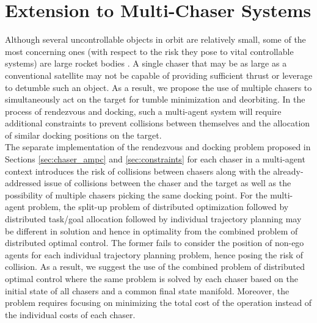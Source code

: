 \section{Extension to Multi-Chaser Systems}
\label{sec:multi-agent}
Although several uncontrollable objects in orbit are relatively small, some of the most concerning ones (with respect to the risk they pose to vital controllable systems) are large rocket bodies \cite{mcknight2021identifying}.
A single chaser that may be as large as a conventional satellite may not be capable of providing sufficient thrust or leverage to detumble such an object.
As a result, we propose the use of multiple chasers to simultaneously act on the target for tumble minimization and deorbiting.
In the process of rendezvous and docking, such a multi-agent system will require additional constraints to prevent collisions between themselves and the allocation of similar docking positions on the target.\\
The separate implementation of the rendezvous and docking problem proposed in Sections \ref{sec:chaser_ampc} and \ref{sec:constraints} for each chaser in a multi-agent context introduces the risk of collisions between chasers along with the already-addressed issue of collisions between the chaser and the target as well as the possibility of multiple chasers picking the same docking point.
For the multi-agent problem, the split-up problem of distributed optimization followed by distributed task/goal allocation followed by individual trajectory planning may be different in solution and hence in optimality from the combined problem of distributed optimal control.
The former fails to consider the position of non-ego agents for each individual trajectory planning problem, hence posing the risk of collision.
As a result, we suggest the use of the combined problem of distributed optimal control where the same problem is solved by each chaser based on the initial state of all chasers and a common final state manifold.
Moreover, the problem requires focusing on minimizing the total cost of the operation instead of the individual costs of each chaser.
